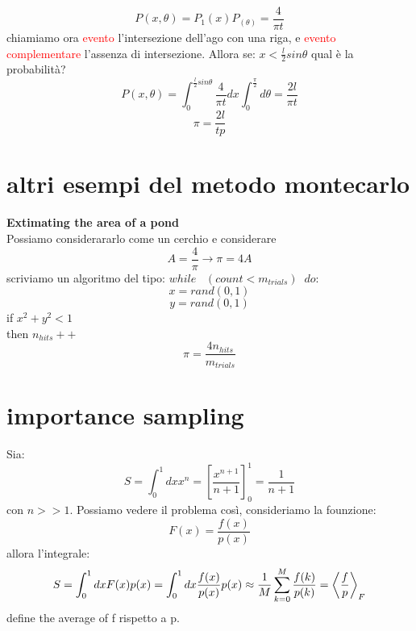 \[P(x,\theta)=P_1(x)P_(\theta)=\frac{4}{\pi t}\]
chiamiamo ora \textcolor{red}{evento} l'intersezione dell'ago con una riga, e \textcolor{red}{evento complementare} l'assenza di intersezione. Allora se: $x<\frac{l}{2}sin\theta$ qual è la probabilità?
\[P(x,\theta)=\int_{0}^{\frac{l}{2}sin\theta}\frac{4}{\pi t} dx\int_{0}^{\frac{\pi}{2}}d\theta=\frac{2l}{\pi t}\]
\[\pi=\frac{2l}{tp}\]

\section{altri esempi del metodo montecarlo}
\textbf{Extimating the area of a pond}
\\
Possiamo considerararlo come un cerchio e considerare
\[A=\frac{4}{\pi} \rightarrow \pi=4A\]
scriviamo un algoritmo del tipo: $while \;\;\; (count<m_{trials}) \;\; do:$
$$x=rand(0,1)$$
$$y=rand(0,1)$$
if $x^2+y^2<1$ 
\\
then $n_{hits}++$
\[\pi=\frac{4n_{hits}}{m_{trials}}\]

\section{importance sampling}
Sia:
\[S=\int_{0}^{1}dxx^n=\left[\frac{x^{n+1}}{n+1}\right]_0^1=\frac{1}{n+1}\] 
con $n>>1$. Possiamo vedere il problema così, consideriamo la founzione:
\[F(x)=\frac{f(x)}{p(x)}\] allora l'integrale:
\[S=\int_{0}^{1}dxF(x)p(x)=\int_{0}^{1}dx\frac{f(x)}{p(x)}p(x)\approx \frac{1}{M}\sum_{k=0}^{M}\frac{f(k)}{p(k)}=\expval{\frac{f}{p}}_F\]
define the average of f rispetto a p.
